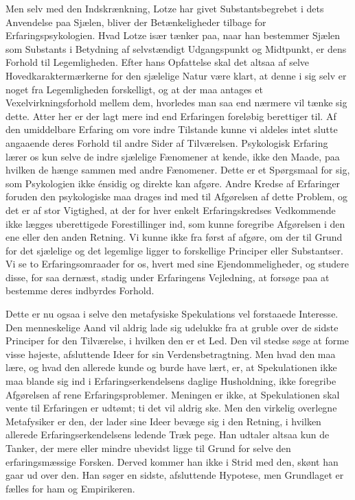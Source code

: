 \documentclass[12pt,a4paper,openany]{book}
\newcommand{\opage}[1]{\marginnote{\footnotesize\textit{[#1]}}}
\begin{document}
Men selv med den Indskrænkning, Lotze har givet Substantsbegrebet i dets
Anvendelse paa Sjælen, bliver der Betænkeligheder tilbage for
Erfaringspsykologien. Hvad Lotze især tænker paa, naar han bestemmer
Sjælen som Substants i Betydning af selvstændigt Udgangspunkt og
Midtpunkt, er dens Forhold til Legemligheden. Efter hans Opfattelse skal
det altsaa af selve Hovedkaraktermærkerne for den sjælelige Natur være
klart, at denne i sig selv er noget fra Legemligheden forskelligt, og at
der maa antages et Vexelvirkningsforhold mellem dem, hvorledes man saa
end nærmere vil tænke sig dette. Atter her er der lagt mere ind end
Erfaringen foreløbig berettiger til. Af den umiddelbare Erfaring om vore
indre Tilstande kunne vi aldeles intet slutte angaaende deres Forhold
til andre Sider af Tilværelsen. Psykologisk Erfaring lærer os kun selve
de indre sjælelige Fænomener at kende,
\opage{16}ikke den Maade, paa hvilken de hænge sammen med andre
Fænomener. Dette er et Spørgsmaal for sig, som Psykologien ikke énsidig
og direkte kan afgøre. Andre Kredse af Erfaringer foruden den
psykologiske maa drages ind med til Afgørelsen af dette Problem, og det
er af stor Vigtighed, at der for hver enkelt Erfaringskredses
Vedkommende ikke lægges uberettigede Forestillinger ind, som kunne
foregribe Afgørelsen i den ene eller den anden Retning. Vi kunne ikke
fra først af afgøre, om der til Grund for det sjælelige og det legemlige
ligger to forskellige Principer eller Substantser. Vi se to
Erfaringsomraader for os, hvert med sine Ejendommeligheder, og studere
disse, for saa dernæst, stadig under Erfaringens Vejledning, at forsøge
paa at bestemme deres indbyrdes Forhold.

Dette er nu ogsaa i selve den metafysiske Spekulations vel forstaaede
Interesse. Den menneskelige Aand vil aldrig lade sig udelukke fra at
gruble over de sidste Principer for den Tilværelse, i hvilken den er et
Led. Den vil stedse søge at forme visse højeste, afsluttende Ideer for
sin Verdensbetragtning. Men hvad den maa lære, og hvad den allerede
kunde og burde have lært, er, at Spekulationen ikke maa blande sig ind i
Erfaringserkendelsens daglige Husholdning, ikke foregribe Afgørelsen af
rene Erfaringsproblemer. Meningen er ikke, at Spekulationen skal vente
til Erfaringen er udtømt; ti det vil aldrig ske. Men den virkelig
overlegne Metafysiker er den, der lader sine Ideer bevæge sig i den
Retning, i hvilken allerede Erfaringserkendelsens ledende Træk pege. Han
udtaler altsaa kun de Tanker, der mere eller mindre ubevidst ligge til
Grund for selve den erfaringsmæssige Forsken. Derved kommer han ikke i
Strid med den, skønt han gaar ud over den. Han søger en sidste,
afsluttende Hypotese, men Grundlaget er fælles for ham og Empirikeren.
\end{document}
